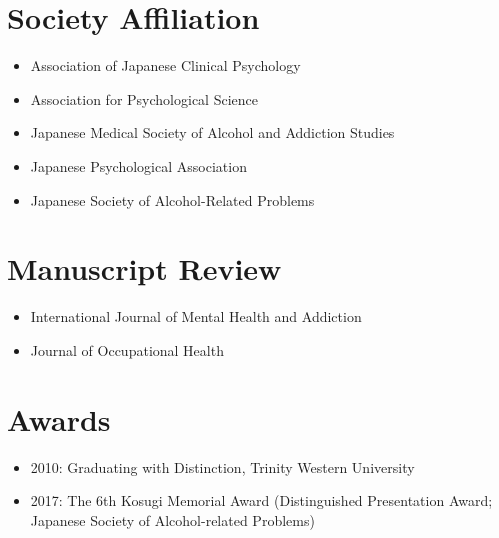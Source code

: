 \documentclass{article}
\begin{document}
\section{Society Affiliation}
\begin{itemize}
	\item Association of Japanese Clinical Psychology
	\item Association for Psychological Science
	\item Japanese Medical Society of Alcohol and Addiction Studies
	\item Japanese Psychological Association
	\item Japanese Society of Alcohol-Related Problems
\end{itemize}

\section{Manuscript Review}
\begin{itemize}
	\item International Journal of Mental Health and Addiction
	\item Journal of Occupational Health
\end{itemize}

\section{Awards}
	\begin{itemize}
		\item 2010: Graduating with Distinction, Trinity Western University
		\item 2017: The 6th Kosugi Memorial Award (Distinguished Presentation Award; Japanese Society of Alcohol-related Problems)
	\end{itemize}
\end{document}
